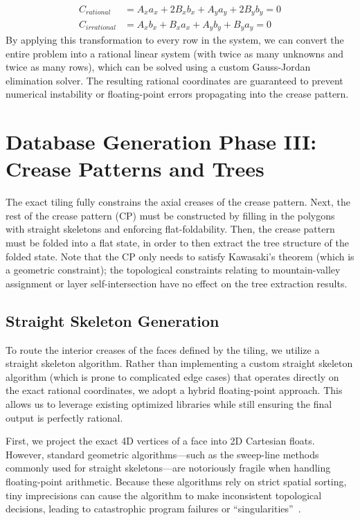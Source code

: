 \documentclass[11pt]{article}
\begin{document}
\begin{align}
    C_{rational} &= A_x a_x + 2 B_x b_x + A_y a_y + 2 B_y b_y = 0 \\
    C_{irrational} &= A_x b_x + B_x a_x + A_y b_y + B_y a_y = 0
\end{align}
By applying this transformation to every row in the system, we can convert the entire problem into a rational linear system (with twice as many unknowns and twice as many rows), which can be solved using a custom Gauss-Jordan elimination solver. The resulting rational coordinates are guaranteed to prevent numerical instability or floating-point errors propagating into the crease pattern.


\section{Database Generation Phase III: Crease Patterns and Trees}\label{sec:cp_generation}

The exact tiling fully constrains the axial creases of the crease pattern. Next, the rest of the crease pattern (CP) must be constructed by filling in the polygons with straight skeletons and enforcing flat-foldability. Then, the crease pattern must be folded into a flat state, in order to then extract the tree structure of the folded state. Note that the CP only needs to satisfy Kawasaki's theorem (which is a geometric constraint); the topological constraints relating to mountain-valley assignment or layer self-intersection have no effect on the tree extraction results.

\subsection{Straight Skeleton Generation}
To route the interior creases of the faces defined by the tiling, we utilize a straight skeleton algorithm. Rather than implementing a custom straight skeleton algorithm (which is prone to complicated edge cases) that operates directly on the exact rational coordinates, we adopt a hybrid floating-point approach. This allows us to leverage existing optimized libraries while still ensuring the final output is perfectly rational. 

First, we project the exact 4D vertices of a face into 2D Cartesian floats. However, standard geometric algorithms---such as the sweep-line methods commonly used for straight skeletons---are notoriously fragile when handling floating-point arithmetic. Because these algorithms rely on strict spatial sorting, tiny imprecisions can cause the algorithm to make inconsistent topological decisions, leading to catastrophic program failures or ``singularities''~\cite{kettner2008classroom}. 
\end{document}

